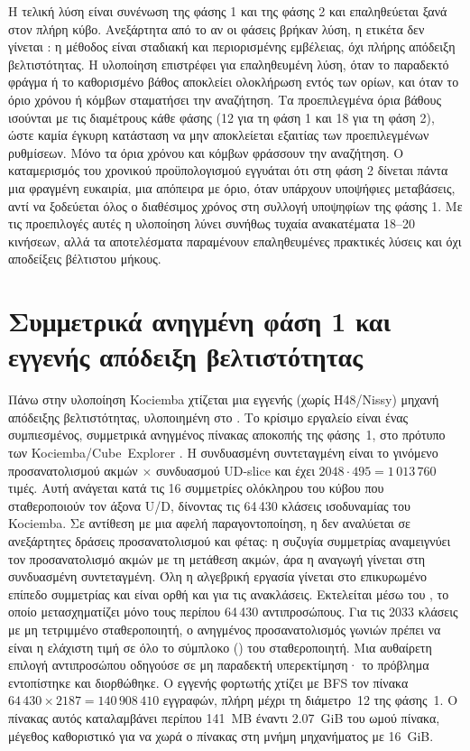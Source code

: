 Η τελική λύση είναι συνένωση της φάσης 1 και της φάσης 2 και επαληθεύεται ξανά στον πλήρη κύβο. Ανεξάρτητα από το αν οι φάσεις βρήκαν λύση, η ετικέτα δεν γίνεται : η μέθοδος είναι σταδιακή και περιορισμένης εμβέλειας, όχι πλήρης απόδειξη βελτιστότητας. Η υλοποίηση επιστρέφει  για επαληθευμένη λύση,  όταν το παραδεκτό φράγμα ή το καθορισμένο βάθος αποκλείει ολοκλήρωση εντός των ορίων, και  όταν το όριο χρόνου ή κόμβων σταματήσει την αναζήτηση. Τα προεπιλεγμένα όρια βάθους ισούνται με τις διαμέτρους κάθε φάσης (12 για τη φάση 1 και 18 για τη φάση 2), ώστε καμία έγκυρη κατάσταση να μην αποκλείεται εξαιτίας των προεπιλεγμένων ρυθμίσεων. Μόνο τα όρια χρόνου και κόμβων φράσσουν την αναζήτηση. Ο καταμερισμός του χρονικού προϋπολογισμού εγγυάται ότι στη φάση 2 δίνεται πάντα μια φραγμένη ευκαιρία, μια απόπειρα με όριο, όταν υπάρχουν υποψήφιες μεταβάσεις, αντί να ξοδεύεται όλος ο διαθέσιμος χρόνος στη συλλογή υποψηφίων της φάσης 1. Με τις προεπιλογές αυτές η υλοποίηση λύνει συνήθως τυχαία ανακατέματα 18--20 κινήσεων, αλλά τα αποτελέσματα παραμένουν επαληθευμένες πρακτικές λύσεις και όχι αποδείξεις βέλτιστου μήκους.

\section{Συμμετρικά ανηγμένη φάση 1 και εγγενής απόδειξη βελτιστότητας}
\label{sec:implementation-sym-proof}
Πάνω στην υλοποίηση Kociemba χτίζεται μια εγγενής (χωρίς H48/Nissy) μηχανή απόδειξης βελτιστότητας, υλοποιημένη στο . Το κρίσιμο εργαλείο είναι ένας συμπιεσμένος, συμμετρικά ανηγμένος πίνακας αποκοπής της φάσης~1, στο πρότυπο των Kociemba/Cube~Explorer \cite{kociembaOptimalSolver,kociembaImplementationDetails}. Η συνδυασμένη συντεταγμένη  είναι το γινόμενο προσανατολισμού ακμών \(\times\) συνδυασμού UD-slice και έχει \(2048\cdot495=1\,013\,760\) τιμές. Αυτή ανάγεται κατά τις 16 συμμετρίες ολόκληρου του κύβου που σταθεροποιούν τον άξονα U/D, δίνοντας τις 64\,430 κλάσεις ισοδυναμίας του Kociemba. Σε αντίθεση με μια αφελή παραγοντοποίηση, η  δεν αναλύεται σε ανεξάρτητες δράσεις προσανατολισμού και φέτας: η συζυγία συμμετρίας αναμειγνύει τον προσανατολισμό ακμών με τη μετάθεση ακμών, άρα η αναγωγή γίνεται στη συνδυασμένη συντεταγμένη. Όλη η αλγεβρική εργασία γίνεται στο επικυρωμένο επίπεδο συμμετρίας  και είναι ορθή και για τις ανακλάσεις. Εκτελείται μέσω του , το οποίο μετασχηματίζει μόνο τους περίπου 64\,430 αντιπροσώπους. Για τις 2033 κλάσεις με μη τετριμμένο σταθεροποιητή, ο ανηγμένος προσανατολισμός γωνιών πρέπει να είναι η ελάχιστη τιμή σε όλο το σύμπλοκο () του σταθεροποιητή. Μια αυθαίρετη επιλογή αντιπροσώπου οδηγούσε σε μη παραδεκτή υπερεκτίμηση· το πρόβλημα εντοπίστηκε και διορθώθηκε. Ο εγγενής φορτωτής χτίζει με BFS τον πίνακα \(64\,430\times2187=140\,908\,410\) εγγραφών, πλήρη μέχρι τη διάμετρο~12 της φάσης~1. Ο πίνακας αυτός καταλαμβάνει περίπου 141~MB έναντι 2.07~GiB του ωμού πίνακα, μέγεθος καθοριστικό για να χωρά ο πίνακας στη μνήμη μηχανήματος με 16~GiB.

